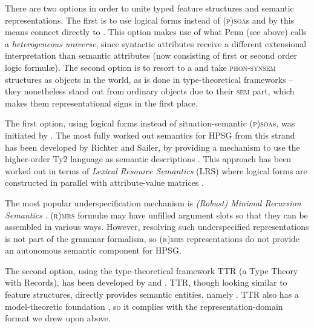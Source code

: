 \documentclass[output=paper]{langsci/langscibook}
\begin{document}
There are two options in order to unite typed feature structures and semantic representations.
%
The first is to use logical forms  instead of \textsc{(p)soa}s and by this means connect directly to .
%
This option makes use of what Penn (see above) calls a \emph{heterogeneous universe},  since syntactic attributes receive a different extensional interpretation than  semantic attributes (now consisting of first or second order logic formul{\ae}).
%
The second option is to resort to a  and take \textsc{phon-synsem} structures as objects in the world, as is done in type-theoretical frameworks  -- they nonetheless stand out from ordinary objects due to their \textsc{sem} part, which makes them representational signs in the first place.



The first option, using logical forms instead of situation-semantic \textsc{(p)soa}s, was initiated by \citet{Nerbonne:1992}. 
%
The most fully worked out semantics for HPSG from this strand has been developed by Richter and Sailer, by providing a mechanism to use the higher-order Ty2 language as semantic descriptions \citep{Richter:Sailer:1999:a}.
%
This approach has been worked out in terms of \emph{Lexical Resource Semantics} (LRS)  %
where logical forms are constructed in parallel with attribute-value matrices \citep{Richter:Sailer:04}.


The most popular underspecification mechanism is \emph{(Robust) Minimal Recursion Semantics}  \citep{Copestake:Flickinger:Pollard:Sag:2005,Copestake:2007}.
%
\textsc{(r)mrs} formul{\ae} may have unfilled argument slots so that they can be assembled in various ways.
%
However, resolving such underspecified representations is not part of the grammar formalism, so \textsc{(r)mrs} representations do not provide an autonomous semantic component for HPSG.



The second option, using the type-theoretical framework  TTR (a Type Theory with Records), has been developed by \citet{Cooper:2008,Cooper:2014:a,Cooper:ms} and \citet{Ginzburg:2012}.
%
TTR, though looking similar to feature structures, directly provides semantic entities, namely  \citep[Sec.~5.2.2]{Ginzburg:2012}.
%
TTR also has a model-theoretic foundation \citep{Cooper:ms}, so it complies with the representation-domain format we drew upon above.
\end{document}
